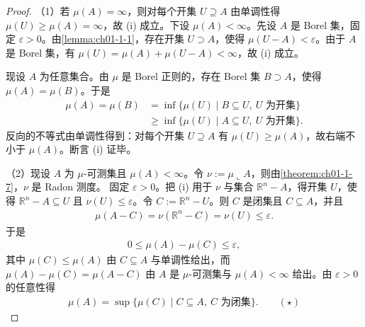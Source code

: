 \documentclass[../../main.tex]{subfiles}
\begin{document}
\begin{proof}
（1）若 $\mu(A)=\infty$，则对每个开集 $U\supseteq A$ 由单调性得 $\mu(U)\geqslant\mu(A)=\infty$，故 (i) 成立。下设 $\mu(A)<\infty$。先设 $A$ 是 Borel 集，固定 $\varepsilon>0$。由\cref{lemma:ch01-1-1}，存在开集 $U\supset A$，使得 $\mu(U-A)<\varepsilon$。由于 $A$ 是 Borel 集，有 $\mu(U)=\mu(A)+\mu(U-A)<\infty$，故 (i) 成立。%

现设 $A$ 为任意集合。由 $\mu$ 是 Borel 正则的，存在 Borel 集 $B\supset A$，使得 $\mu(A)=\mu(B)$。于是
\begin{align*}
\mu(A)=\mu(B)&=\inf\{\mu(U)\mid B\subseteq U,\ U\text{ 为开集}\}\\
&\geqslant\inf\{\mu(U)\mid A\subseteq U,\ U\text{ 为开集}\}.
\end{align*}
反向的不等式由单调性得到：对每个开集 $U\supseteq A$ 有 $\mu(U)\geqslant\mu(A)$，故右端不小于 $\mu(A)$。断言 (i) 证毕。

（2）现设 $A$ 为 $\mu$-可测集且 $\mu(A)<\infty$。令 $\nu:=\mu\llcorner A$，则由\cref{theorem:ch01-1-7}，$\nu$ 是 Radon 测度。%
固定 $\varepsilon>0$。把 (i) 用于 $\nu$ 与集合 $\mathbb{R}^{n}-A$，得开集 $U$，使得 $\mathbb{R}^{n}-A\subseteq U$ 且 $\nu(U)\leqslant\varepsilon$。令 $C:=\mathbb{R}^{n}-U$。则 $C$ 是闭集且 $C\subseteq A$，并且
\begin{align*}
\mu(A-C)=\nu(\mathbb{R}^{n}-C)=\nu(U)\leqslant\varepsilon.
\end{align*}
于是
\begin{align*}
0\leqslant\mu(A)-\mu(C)\leqslant\varepsilon,
\end{align*}
其中 $\mu(C)\leqslant\mu(A)$ 由 $C\subseteq A$ 与单调性给出，而 $\mu(A)-\mu(C)=\mu(A-C)$ 由 $A$ 是 $\mu$-可测集与 $\mu(A)<\infty$ 给出。由 $\varepsilon>0$ 的任意性得
\begin{align*}
\mu(A)=\sup\{\mu(C)\mid C\subseteq A,\ C\text{ 为闭集}\}.\qquad(\star)
\end{align*}


\end{proof}
\end{document}

